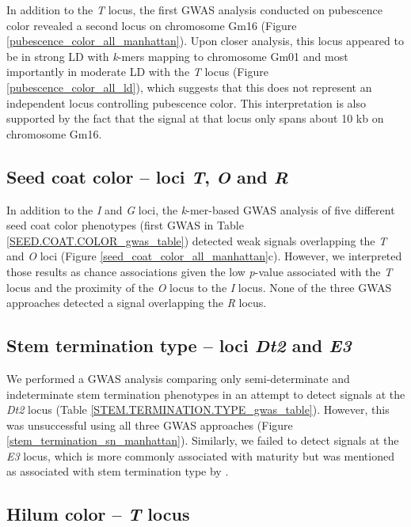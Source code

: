 \documentclass[12pt]{article}
\begin{document}
In addition to the \textit{T} locus, the first GWAS analysis conducted on pubescence color
revealed a second locus on chromosome Gm16
(Figure \ref{pubescence_color_all_manhattan}). Upon closer analysis, this locus
appeared to be in strong LD with \emph{k}-mers mapping to chromosome Gm01 and
most importantly in moderate LD with the \emph{T} locus (Figure
\ref{pubescence_color_all_ld}), which suggests that this does not represent an
independent locus controlling pubescence color. This interpretation is also
supported by the fact that the signal at that locus only spans about 10 kb on
chromosome Gm16.

\subsection*{Seed coat color -- loci \textit{T}, \textit{O} and \textit{R}}
\label{annexe-sv-gwas-seed-coat-color-t-o}

In addition to the \textit{I} and \textit{G} loci, the \textit{k}-mer-based
GWAS analysis of five different seed coat color phenotypes (first GWAS in Table
\ref{SEED.COAT.COLOR_gwas_table}) detected weak signals overlapping the
\emph{T} and \emph{O} loci (Figure \ref{seed_coat_color_all_manhattan}c).
However, we interpreted those results as chance associations given the low
\textit{p}-value associated with the \emph{T} locus and the proximity of the
\emph{O} locus to the \emph{I} locus. None of the three GWAS approaches detected
a signal overlapping the \textit{R} locus.

\subsection*{Stem termination type -- loci \textit{Dt2} and \textit{E3}}
\label{sv-gwas-stem-termination}

We performed a GWAS analysis comparing only semi-determinate and indeterminate
stem termination phenotypes in an attempt to detect signals at the \emph{Dt2}
locus (Table \ref{STEM.TERMINATION.TYPE_gwas_table}).  However, this was
unsuccessful using all three GWAS approaches (Figure
\ref{stem_termination_sn_manhattan}). Similarly, we failed to detect signals at
the \textit{E3} locus, which is more commonly associated with maturity but was
mentioned as associated with stem termination type by .

\subsection*{Hilum color -- \textit{T} locus}
\label{annexe-sv-gwas-results-hilum-color-t}
\end{document}
